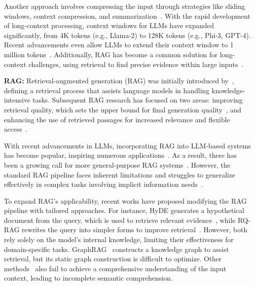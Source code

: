 \documentclass[sigconf]{acmart}
\begin{document}
Another approach involves compressing the input through strategies like sliding windows, context compression, and summarization~\cite{longctx,pcw,jiang2023longllmlingua,lee2024humaninspiredreadingagentgist,zhang2024soaring}. With the rapid development of long-context processing, context windows for LLMs have expanded significantly, from 4K tokens (e.g., Llama-2)\cite{llama} to 128K tokens (e.g., Phi-3, GPT-4)\cite{abdin2024phi3, gpt-4}. Recent advancements even allow LLMs to extend their context window to 1 million tokens~\cite{glm2024chatglm}. Additionally, RAG has become a common solution for long-context challenges, using retrieval to find precise evidence within large inputs~\cite{longctx}.

\textbf{RAG:} Retrieval-augmented generation (RAG) was initially introduced by~\citet{lewis2020retrieval}, defining a retrieval process that assists language models in handling knowledge-intensive tasks. Subsequent RAG research has focused on two areas: improving retrieval quality, which sets the upper bound for final generation quality~\cite{qian2023webbrain,gao2024retrievalaugmented}, and enhancing the use of retrieved passages for increased relevance and flexible access~\cite{FiD,jiang2023active,mao2023largelanguagemodelsknow, qian2024grounding,ragstudio}.

With recent advancements in LLMs, incorporating RAG into LLM-based systems has become popular, inspiring numerous applications~\cite{raghallucination,cissurvey}. As a result, there has been a growing call for more general-purpose RAG systems~\cite{zhu2024largelanguagemodelsinformation,trustsurvey}. However, the standard RAG pipeline faces inherent limitations and struggles to generalize effectively in complex tasks involving implicit information needs~\cite{gao2024retrievalaugmented}.

To expand RAG’s applicability, recent works have proposed modifying the RAG pipeline with tailored approaches. For instance, HyDE generates a hypothetical document from the query, which is used to retrieve relevant evidence~\cite{gao2022precisezeroshotdenseretrieval}, while RQ-RAG rewrites the query into simpler forms to improve retrieval~\cite{chan2024rqraglearningrefinequeries}. However, both rely solely on the model’s internal knowledge, limiting their effectiveness for domain-specific tasks. GraphRAG~\cite{edge2024localglobalgraphrag} constructs a knowledge graph to assist retrieval, but its static graph construction is difficult to optimize. Other methods~\cite{qian2024longllmsnecessitylongcontexttasks,gutiérrez2024hipporagneurobiologicallyinspiredlongterm,chan2024rqraglearningrefinequeries} also fail to achieve a comprehensive understanding of the input context, leading to incomplete semantic comprehension.
\end{document}
